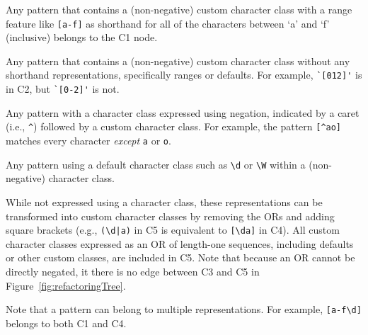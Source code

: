 \begin{description}  \itemsep -1pt
\item[C1:] Any pattern that contains a (non-negative) custom character class with  a range feature like \verb![a-f]! as shorthand for all of the characters between `a' and `f' (inclusive) belongs to the C1 node.


\item[C2:] Any pattern that contains a (non-negative) custom character class  without any shorthand representations, specifically ranges or defaults. For example, \verb!`[012]'! is in C2, but \verb!`[0-2]'! is not.


\item[C3:] Any pattern with a character class expressed using negation, indicated by a caret (i.e., \verb!^!) followed by a custom character class.
For example, the pattern \verb![^ao]! matches every character \emph{except} \verb!a! or \verb!o!. 


\item[C4:]Any pattern using a default character class such as \verb!\d! or \verb!\W! within a (non-negative) character class. %

\item[C5:]  While not expressed using a character class, these representations can be transformed into custom character classes by removing the ORs and adding square brackets (e.g., \verb!(\d|a)! in C5 is equivalent to \verb![\da]! in C4). All custom character classes expressed as an OR of length-one sequences, including defaults or other custom classes, are included in C5. Note that because an OR cannot be directly negated, it there is no edge between C3 and C5 in Figure~\ref{fig:refactoringTree}. 
\end{description}

Note that a pattern can belong to multiple representations. For example,  \verb![a-f\d]! belongs to both C1 and C4.  

